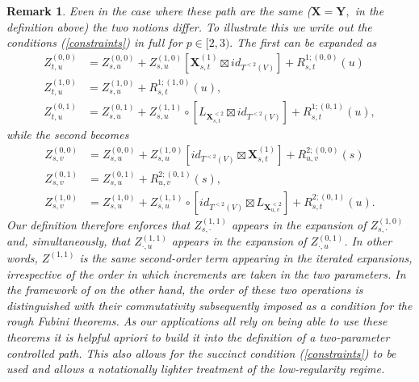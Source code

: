 \documentclass{article}%
\newtheorem{remark}[theorem]{Remark}
\begin{document}
\begin{remark}
Even in the case where these path are the same ($\mathbf{X=Y,}$ in the
definition above) the two notions differ. To illustrate this we write
out the conditions (\ref{constraints}) in full for $p\in\lbrack2,3).$ The
first can be expanded as%
\begin{align*}
Z_{t,u}^{\left(  0,0\right)  }  & =Z_{s,u}^{\left(  0,0\right)  }%
+Z_{s,u}^{\left(  1,0\right)  }\left[  \mathbf{X}^{(1)}_{s,t}\boxtimes id_{T^{<2}(V)} \right]
+R_{s,t}^{1;\left(  0,0\right)  }\left(  u\right) \\
Z_{t,u}^{\left(  1,0\right)  }  & =Z_{s,u}^{\left(  1,0\right)  }%
+R_{s,t}^{1;\left(  1,0\right)  }\left(  u\right)  ,\\
Z_{t,u}^{\left(  0,1\right)  }  & =Z_{s,u}^{\left(  0,1\right)  }%
+Z_{s,u}^{\left(  1,1\right)  }\circ\left[  L_{\mathbf{X}^{< 2}_{s,t}}\boxtimes id_{T^{<2}(V)} \right]  +R_{s,t}^{1;\left(  0,1\right)  }\left(  u\right)  ,
\end{align*}
while the second becomes
\begin{align*}
Z_{s,v}^{\left(  0,0\right)  }  & =Z_{s,u}^{\left(  0,0\right)  }%
+Z_{s,u}^{\left(  1,0\right)  }\left[id_{T^{<2}(V)} \boxtimes \mathbf{X}^{(1)}_{s,t}  \right]
+R_{u,v}^{2;\left(  0,0\right)  }\left(  s\right) \\
Z_{s,v}^{\left(  0,1\right)  }  & =Z_{s,u}^{\left(  0,1\right)  }%
+R_{u,v}^{2;\left(  0,1\right)  }\left(  s\right)  ,\\
Z_{s,v}^{\left(  1,0\right)  }  & =Z_{s,u}^{\left(  1,0\right)  }%
+Z_{s,u}^{\left(  1,1\right)  }\circ\left[  id_{T^{<2}(V)} \boxtimes L_{\mathbf{X}^{< 2}_{u,v}%
}\right]  +R_{s,t}^{2;\left(  0,1\right)  }\left(  u\right)  .
\end{align*}
Our definition therefore enforces that \(Z_{s,\cdot}^{(1,1)}\) appears in the expansion of \(Z_{s,\cdot}^{(1,0)}\) and, simultaneously, that \(Z_{\cdot,u}^{(1,1)}\) appears in the expansion of \(Z_{\cdot,u}^{(0,1)}\). In other words, \(Z^{(1,1)}\) is the same second-order term appearing in the iterated expansions, irrespective of the order in which increments are taken in the two parameters. In the framework of \cite{gerasimovivcs2019hormander} on the other hand, the order
of these two operations is distinguished with their commutativity
subsequently imposed as a condition for the rough Fubini theorems. As our
applications all rely on being able to use these theorems it is helpful
apriori to build it into the definition of a two-parameter controlled path.
This also allows for the succinct condition (\ref{constraints}) to be used and
allows a notationally lighter treatment of the low-regularity regime.
\end{remark}
\end{document}
